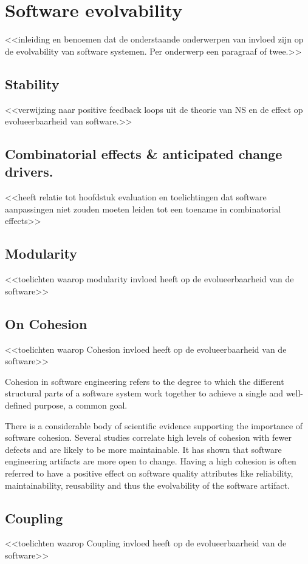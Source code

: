 \section{Software evolvability}

<<inleiding en benoemen dat de onderstaande onderwerpen van invloed zijn op de
evolvability van software systemen. Per onderwerp een paragraaf of twee.>>

\subsection{Stability}
<<verwijzing naar positive feedback loops uit de theorie van NS en de effect op
evolueerbaarheid van software.>>

\subsection{Combinatorial effects \& anticipated change drivers.}
<<heeft relatie tot hoofdstuk evaluation en toelichtingen dat software aanpassingen niet
zouden moeten leiden tot een toename in combinatorial effects>>

\subsection{Modularity}
<<toelichten waarop modularity invloed heeft op de evolueerbaarheid van de software>>

\subsection{On Cohesion}
<<toelichten waarop Cohesion invloed heeft op de evolueerbaarheid van de software>>

Cohesion in software engineering refers to the degree to which the different structural
parts of a software system work together to achieve a single and well-defined purpose, a
common goal. 

There is a considerable body of scientific evidence supporting the importance of software
cohesion. Several studies correlate high levels of cohesion with fewer defects and are
likely to be more maintainable. It has shown that software engineering artifacts are more
open to change. Having a high cohesion is often referred to have a positive effect on
software quality attributes like reliability, maintainability, reusability and thus the
evolvability of the software artifact. 

\subsection{Coupling}
<<toelichten waarop Coupling invloed heeft op de evolueerbaarheid van de software>>